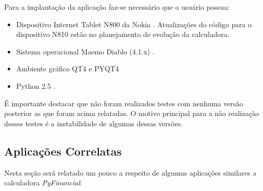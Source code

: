 
Para a implantação da aplicação faz-se necessário que o usuário possua:

\begin{itemize}
 \item Dispositivo Internet Tablet N800 da Nokia \cite{n800}. Atualizações do código para o dispositivo N810 estão no planejamento de evolução da calculadora.
 \item Sistema operacional Maemo Diablo (4.1.x) \cite{diablo}.
 \item Ambiente gráfico QT4 \cite{qt4} e PYQT4 \cite{pyqt4}
 \item Python 2.5 \cite{python}.
\end{itemize}

É importante destacar que não foram realizados testes com nenhuma versão posterior as que foram acima relatadas. O motivo principal para a não realização desses testes é a instabilidade de algumas dessas versões.


\subsection{Aplicações Correlatas}


Nesta seção será relatado um pouco a respeito de algumas aplicações similares a calculadora \textit{PyFinancial}:

